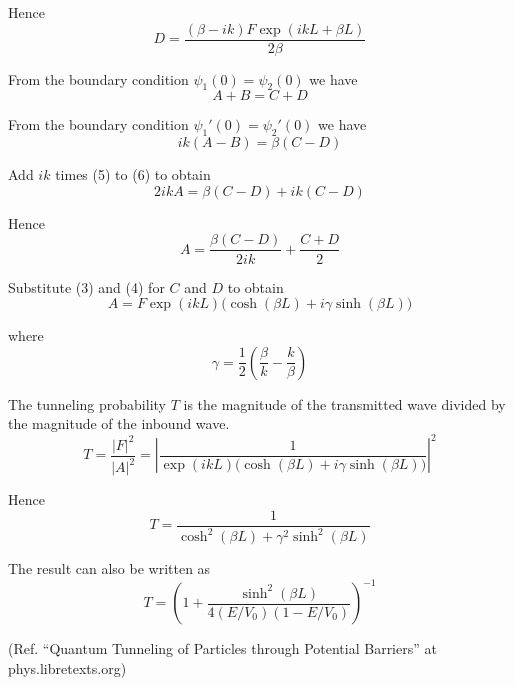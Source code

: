 Hence
\begin{equation*}
D=\frac{(\beta-ik)F\exp(ikL+\beta L)}{2\beta}
\tag{4}
\end{equation*}

From the boundary condition $\psi_1(0)=\psi_2(0)$ we have
\begin{equation*}
A+B=C+D
\tag{5}
\end{equation*}

From the boundary condition $\psi_1'(0)=\psi_2'(0)$ we have
\begin{equation*}
ik(A-B)=\beta(C-D)
\tag{6}
\end{equation*}

Add $ik$ times (5) to (6) to obtain
\begin{equation*}
2ikA=\beta(C-D)+ik(C-D)
\end{equation*}

Hence
\begin{equation*}
A=\frac{\beta(C-D)}{2ik}+\frac{C+D}{2}
\end{equation*}

Substitute (3) and (4) for $C$ and $D$ to obtain
\begin{equation*}
A = F\exp(ikL)\bigl(\cosh(\beta L)+i\gamma\sinh(\beta L)\bigr)
\tag{7}
\end{equation*}

where
\begin{equation*}
\gamma=\frac{1}{2}\left(\frac{\beta}{k}-\frac{k}{\beta}\right)
\end{equation*}

The tunneling probability $T$ is the magnitude of the transmitted
wave divided by the magnitude of the inbound wave.
\begin{equation*}
T=\frac{|F|^2}{|A|^2}
=\left|\frac{1}{\exp(ikL)\bigl(\cosh(\beta L)+i\gamma\sinh(\beta L)\bigr)}\right|^2
\end{equation*}

Hence
\begin{equation*}
T=\frac{1}{\cosh^2(\beta L)+\gamma^2\sinh^2(\beta L)}
\tag{8}
\end{equation*}

The result can also be written as
\begin{equation*}
T=\left(1+\frac{\sinh^2(\beta L)}{4(E/V_0)(1-E/V_0)}\right)^{-1}
\tag{9}
\end{equation*}

(Ref. ``Quantum Tunneling of Particles through Potential Barriers''
at phys.libretexts.org)


